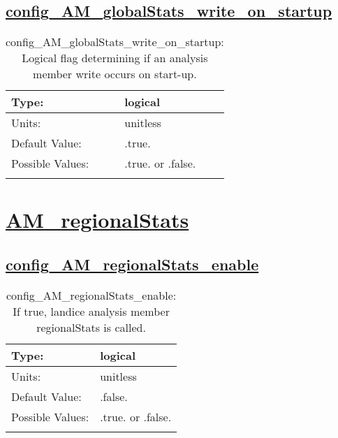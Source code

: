 \subsection[config\_AM\_globalStats\_write\_on\_startup]{\hyperref[sec:nm_tab_AM_globalStats]{config\_AM\_globalStats\_write\_on\_startup}}
\label{subsec:nm_sec_config_AM_globalStats_write_on_startup}
\begin{center}
\begin{longtable}{| p{2.0in} || p{4.0in} |}
    \hline
    Type: & logical \\
    \hline
    Units: & \si{unitless} \\
    \hline
    Default Value: & .true. \\
    \hline
    Possible Values: & .true. or .false. \\
    \hline
    \caption{config\_AM\_globalStats\_write\_on\_startup: Logical flag determining if an analysis member write occurs on start-up.}
\end{longtable}
\end{center}
\section[AM\_regionalStats]{\hyperref[sec:nm_tab_AM_regionalStats]{AM\_regionalStats}}
\label{sec:nm_sec_AM_regionalStats}
\subsection[config\_AM\_regionalStats\_enable]{\hyperref[sec:nm_tab_AM_regionalStats]{config\_AM\_regionalStats\_enable}}
\label{subsec:nm_sec_config_AM_regionalStats_enable}
\begin{center}
\begin{longtable}{| p{2.0in} || p{4.0in} |}
    \hline
    Type: & logical \\
    \hline
    Units: & \si{unitless} \\
    \hline
    Default Value: & .false. \\
    \hline
    Possible Values: & .true. or .false. \\
    \hline
    \caption{config\_AM\_regionalStats\_enable: If true, landice analysis member regionalStats is called.}
\end{longtable}
\end{center}
